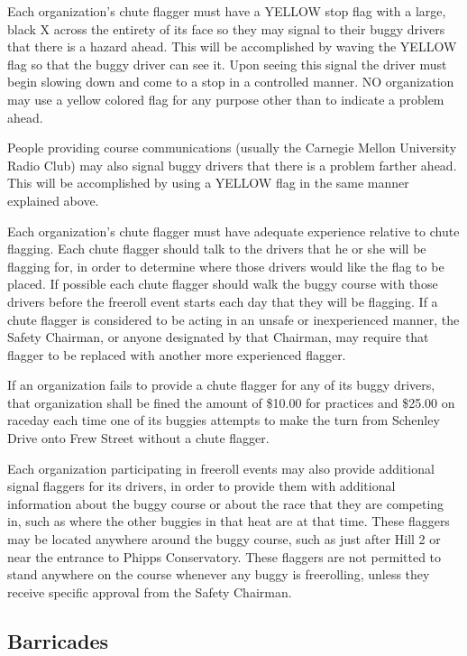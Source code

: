 	Each organization's chute flagger must have a YELLOW stop flag with a large,
	black X across the entirety of its face so they may signal to their buggy drivers 
	that there is a hazard ahead. This will be accomplished by waving the YELLOW flag so 
	that the buggy driver can see it. Upon seeing this signal the driver must begin 
	slowing down and come to a stop in a controlled manner. NO organization may use a 
	yellow colored flag for any purpose other than to indicate a problem ahead.

	People providing course communications (usually the Carnegie Mellon
	University Radio Club) may also signal buggy drivers that there is a problem
	farther ahead. This will be accomplished by using a YELLOW flag in the same
	manner explained above.

	Each organization's chute flagger must have adequate experience relative to
	chute flagging. Each chute flagger should talk to the drivers that he or she
	will be flagging for, in order to determine where those drivers would like the
	flag to be placed. If possible each chute flagger should walk the buggy course
	with those drivers before the freeroll event starts each day that
	they will be flagging. If a chute flagger is considered to be acting in an
	unsafe or inexperienced manner, the Safety Chairman, or anyone designated by
	that Chairman, may require that flagger to be replaced with another more
	experienced flagger.

	If an organization fails to provide a chute flagger for any of its buggy
	drivers, that organization shall be fined the amount of \$10.00 for practices
	and \$25.00 on raceday each time one
	of its buggies attempts to make the turn from Schenley Drive onto Frew Street
	without a chute flagger.

	Each organization participating in freeroll events may also provide
	additional signal flaggers for its drivers, in order to provide them with
	additional information about the buggy course or about the race that they are
	competing in, such as where the other buggies in that heat are at that time.
	These flaggers may be located anywhere around the buggy course, such as just
	after Hill 2 or near the entrance to Phipps Conservatory. These flaggers are
	not permitted to stand anywhere on the course whenever any buggy is 
	freerolling, unless they receive specific approval from the Safety Chairman.
	
	
\subsection{Barricades}

